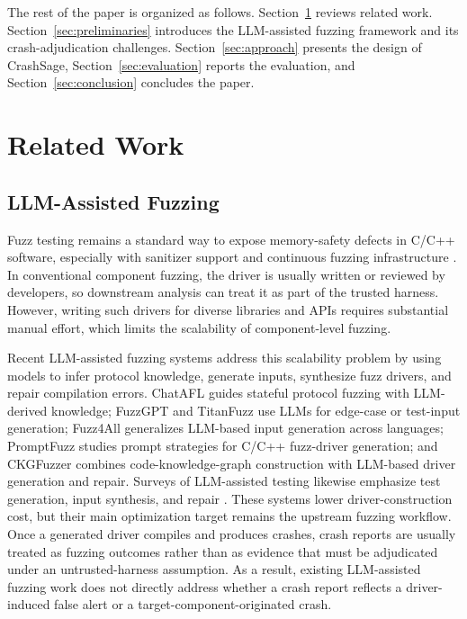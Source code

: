 \documentclass[pdflatex,sn-basic]{sn-jnl}%
\theoremstyle{thmstyleone}%
\theoremstyle{thmstyletwo}%
\theoremstyle{thmstylethree}%
\begin{document}
The rest of the paper is organized as follows. Section~\ref{sec:related-work} reviews related work. Section~\ref{sec:preliminaries} introduces the LLM-assisted fuzzing framework and its crash-adjudication challenges. Section~\ref{sec:approach} presents the design of CrashSage, Section~\ref{sec:evaluation} reports the evaluation, and Section~\ref{sec:conclusion} concludes the paper.


\section{Related Work}
\label{sec:related-work}

\subsection{LLM-Assisted Fuzzing}

Fuzz testing remains a standard way to expose memory-safety defects in C/C++ software, especially with sanitizer support and continuous fuzzing infrastructure \citep{ref16,ref17,ref18,ref19,ref7}. In conventional component fuzzing, the driver is usually written or reviewed by developers, so downstream analysis can treat it as part of the trusted harness. However, writing such drivers for diverse libraries and APIs requires substantial manual effort, which limits the scalability of component-level fuzzing.

Recent LLM-assisted fuzzing systems address this scalability problem by using models to infer protocol knowledge, generate inputs, synthesize fuzz drivers, and repair compilation errors. ChatAFL \citep{ref8} guides stateful protocol fuzzing with LLM-derived knowledge; FuzzGPT \citep{ref9} and TitanFuzz \citep{ref10} use LLMs for edge-case or test-input generation; Fuzz4All \citep{ref11} generalizes LLM-based input generation across languages; PromptFuzz \citep{ref13} studies prompt strategies for C/C++ fuzz-driver generation; and CKGFuzzer \citep{ref12} combines code-knowledge-graph construction with LLM-based driver generation and repair. Surveys of LLM-assisted testing likewise emphasize test generation, input synthesis, and repair \citep{ref27}. These systems lower driver-construction cost, but their main optimization target remains the upstream fuzzing workflow. Once a generated driver compiles and produces crashes, crash reports are usually treated as fuzzing outcomes rather than as evidence that must be adjudicated under an untrusted-harness assumption. As a result, existing LLM-assisted fuzzing work does not directly address whether a crash report reflects a driver-induced false alert or a target-component-originated crash.
\end{document}
